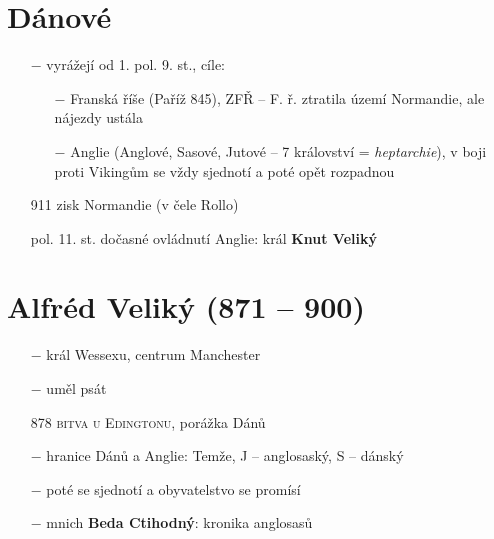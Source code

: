 \documentclass{article}
\begin{document}
\section*{Dánové}
\begin{itemize}
    \vspace{-0.5em}
    \setlength\itemsep{0.15em}
    \item[$-$] vyrážejí od 1. pol. 9. st., cíle:
    \begin{itemize}
        \vspace{-0.5em}
        \setlength\itemsep{0.15em}
        \item[$-$] Franská říše (Paříž 845), ZFŘ -- F. ř. ztratila území Normandie, ale nájezdy ustála
        \item[$-$] Anglie (Anglové, Sasové, Jutové -- 7 království = \textit{heptarchie}), v boji proti Vikingům se vždy sjednotí a poté opět rozpadnou
    \end{itemize}
    \item[911] zisk Normandie (v čele Rollo)
    \item[pol. 11. st.] dočasné ovládnutí Anglie: král \textbf{Knut Veliký}
\end{itemize}

\section*{Alfréd Veliký (871 -- 900)}
\begin{itemize}
    \vspace{-0.5em}
    \setlength\itemsep{0.15em}
    \item[$-$] král Wessexu, centrum Manchester
    \item[$-$] uměl psát
    \item[878] \textsc{bitva u Edingtonu}, porážka Dánů
    \item[$-$] hranice Dánů a Anglie: Temže, J -- anglosaský, S -- dánský
    \item[$-$] poté se sjednotí a obyvatelstvo se promísí
    \item[$-$] mnich \textbf{Beda Ctihodný}: kronika anglosasů
\end{itemize}
\end{document}
